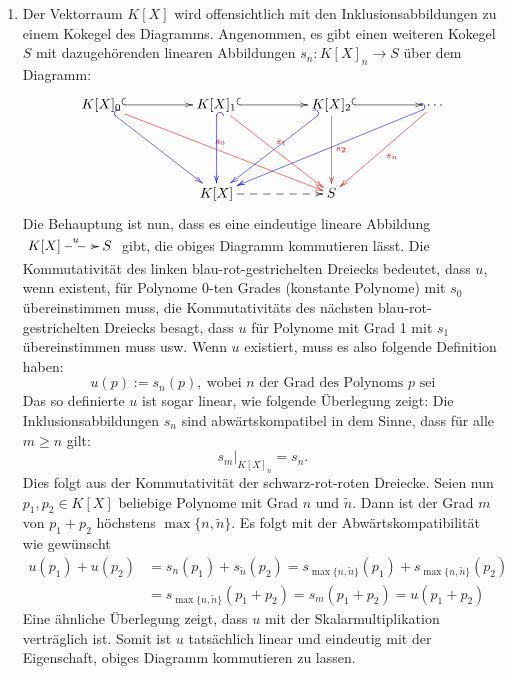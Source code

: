 \documentclass{pizzablatt}
\begin{document}
\begin{aufgabe}{}
\begin{enumerate}
\item Der Vektorraum $K[X]$ wird offensichtlich mit den Inklusionsabbildungen zu einem Kokegel des Diagramms. Angenommen, es gibt einen weiteren Kokegel $S$ mit dazugehörenden linearen Abbildungen $s_n:K[X]_{n} \to S$ über dem Diagramm:
\[ \xymatrixcolsep{4pc}\xymatrixrowsep{4pc}\xymatrix {
    K[X]_0 \ar@{^{(}->}[r] \ar@[blue]@{^{(}->}[rd] \ar@[red][drr]^{\textcolor{red}{s_0}}
  & K[X]_1 \ar@{^{(}->}[r] \ar@[blue]@{^{(}->}[d]  \ar@[red][dr]^{\textcolor{red}{s_1}}
  & K[X]_2 \ar@{^{(}->}[r] \ar@[blue]@{_{(}->}[dl] \ar@[red][d]^{\textcolor{red}{s_2}}
  & \cdots \ar@[blue]@{_{(}->}[dll] \ar@[red][dl]^{\textcolor{red}{s_n}}
  \\
  & K[X] \ar@{-->}[r] & S
} \]
Die Behauptung ist nun, dass es eine eindeutige lineare Abbildung $\xymatrix{K[X] \ar@{-->}[r]^{u} & S}$ gibt, die obiges Diagramm kommutieren lässt. Die Kommutativität des linken blau-rot-gestrichelten Dreiecks bedeutet, dass $u$, wenn existent, für Polynome 0-ten Grades (konstante Polynome) mit $s_0$ übereinstimmen muss, die Kommutativitäts des nächsten blau-rot-gestrichelten Dreiecks besagt, dass $u$ für Polynome mit Grad 1 mit $s_1$ übereinstimmen muss usw. Wenn $u$ existiert, muss es also folgende Definition haben:
\[ u(p) := s_n(p),\ \text{wobei $n$ der Grad des Polynoms $p$ sei} \]
Das so definierte $u$ ist sogar linear, wie folgende Überlegung zeigt: Die Inklusionsabbildungen $s_n$ sind abwärtskompatibel in dem Sinne, dass für alle $m \geq n$ gilt:
\[ s_m|_{K[X]_n} = s_n. \]
Dies folgt aus der Kommutativität der schwarz-rot-roten Dreiecke. Seien nun $p_1, p_2 \in K[X]$ beliebige Polynome mit Grad $n$ und $\widetilde{n}$. Dann ist der Grad $m$ von $p_1 + p_2$ höchstens $\max\{n, \widetilde{n}\}$. Es folgt mit der Abwärtskompatibilität wie gewünscht
\begin{align*}
u(p_{1}) + u(p_{2}) & = s_{n}(p_{1}) + s_{\widetilde{n}}(p_{2}) = s_{\max\{n, \widetilde{n}\}}(p_{1}) + s_{\max\{n, \widetilde{n}\}}(p_{2}) \\
&= s_{\max\{n, \widetilde{n}\}}(p_{1} + p_{2}) = s_{m}(p_{1} + p_{2}) = u(p_{1} + p_{2})
\end{align*}
Eine ähnliche Überlegung zeigt, dass $u$ mit der Skalarmultiplikation verträglich ist. Somit ist $u$ tatsächlich linear und eindeutig mit der Eigenschaft, obiges Diagramm kommutieren zu lassen.


\end{enumerate}
\end{aufgabe}
\end{document}
